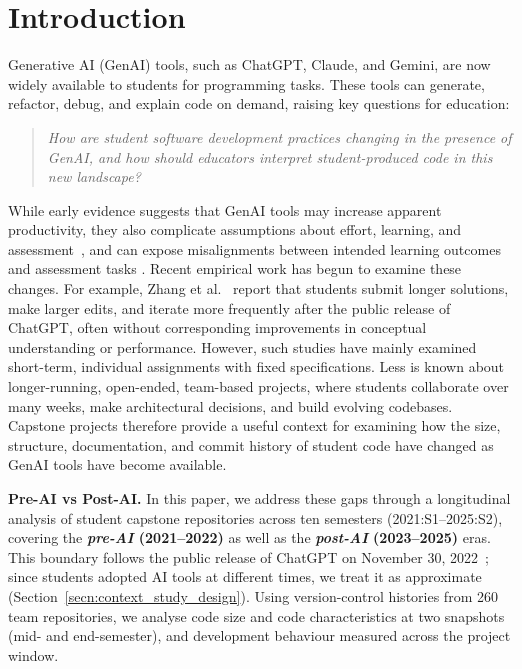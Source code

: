 \documentclass[sigconf,authorversion]{acmart}
\newcommand{\todo}[1]{#1}
\begin{document}
\maketitle

\section{Introduction}
Generative AI (GenAI) tools, such as ChatGPT, Claude, and Gemini, are now widely available to students for programming tasks. These tools can generate, refactor, debug, and explain code on demand, raising key questions for education:
%
\begin{quote}
    \emph{How are student software development practices changing in the presence of GenAI, and how should educators interpret student-produced code in this new landscape?} 
\end{quote}
%
While early evidence suggests that GenAI tools may increase apparent productivity, they also complicate assumptions about effort, learning, and assessment~\cite{jovst2024impact, lyu2024evaluating}, and can expose misalignments between intended learning outcomes and assessment tasks \cite{brabrand2026constructive}.
Recent empirical work has begun to examine these changes. For example, Zhang et al.~\cite{zhang2026changes} report that students submit longer solutions, make larger edits, and iterate more frequently after the public release of ChatGPT, often without corresponding improvements in conceptual understanding or performance. However, such studies have mainly examined short-term, individual assignments with fixed specifications. Less is known about longer-running, open-ended, team-based projects, where students collaborate over many weeks, make architectural decisions, and build evolving codebases. \todo{Capstone projects therefore provide a useful context for examining how the size, structure, documentation, and commit history of student code have changed as GenAI tools have become available.}

\textbf{Pre-AI vs Post-AI.}
In this paper, we address these gaps through a longitudinal analysis of student capstone repositories across ten semesters (2021:S1--2025:S2), covering the \textbf{\emph{pre-AI} (2021--2022)} as well as the \textbf{\emph{post-AI} (2023--2025)} eras. 
\todo{This boundary follows the public release of ChatGPT on November 30, 2022~\cite{openai2022chatgpt}; since students adopted AI tools at different times, we treat it as approximate (Section~\ref{secn:context_study_design}).}
Using version-control histories from 260 team repositories, we analyse code size and code characteristics at two snapshots (mid- and end-semester), and development behaviour measured across the project window.
\end{document}
